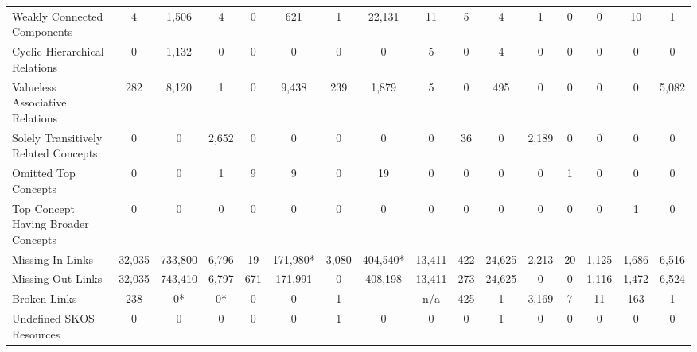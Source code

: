 \begin{table}[h]
\begin{center}
{\begin{tabular}{lccccccccccccccc}
Weakly Connected Components & 4 & 1,506 & 4 & 0 & 621 & 1 & 22,131 & 11 & 5 & 4 & 1 & 0 & 0 & 10 & 1 \\

Cyclic Hierarchical Relations & 0 & 1,132 & 0 & 0 & 0 & 0 & 0 & 5 & 0 & 4 & 0 & 0 & 0 & 0 & 0 \\

Valueless Associative Relations & 282 & 8,120 & 1 & 0 & 9,438 & 239 & 1,879 & 5 & 0 & 495 & 0 & 0 & 0 & 0 & 5,082 \\

Solely Transitively Related Concepts & 0 & 0 & 2,652 & 0 & 0 & 0 & 0 & 0 & 36 & 0 & 2,189 & 0 & 0 & 0 & 0 \\

Omitted Top Concepts & 0 & 0 & 1 & 9 & 9 & 0 & 19 & 0 & 0 & 0 & 0 & 1 & 0 & 0 & 0 \\

Top Concept Having Broader Concepts & 0 & 0 & 0 & 0 & 0 & 0 & 0 & 0 & 0 & 0 & 0 & 0 & 0 & 1 & 0 \\

\midrule

Missing In-Links & 32,035 & 733,800 & 6,796 & 19 & 171,980* & 3,080 & 404,540* & 13,411 & 422 & 24,625 & 2,213 & 20 & 1,125 & 1,686 & 6,516 \\

Missing Out-Links & 32,035 & 743,410 & 6,797 & 671 & 171,991 & 0 & 408,198 & 13,411 & 273 & 24,625 & 0 & 0 & 1,116 & 1,472 & 6,524 \\

Broken Links & 238 & 0* & 0* & 0 & 0 & 1 && n/a & 425 & 1 & 3,169 & 7 & 11 & 163 & 1 \\

Undefined SKOS Resources & 0 & 0 & 0 & 0 & 0 & 1 & 0 & 0 & 0 & 1 & 0 & 0 & 0 & 0 & 0 \\

\bottomrule
\end{tabular}
}
\end{center}
\end{table}

